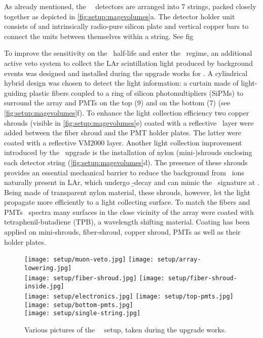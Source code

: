As already mentioned, the \gerda\ \phasetwo\ detectors are arranged into 7 strings, packed
closely together as depicted in \cref{fig:setup:magevolumes}a. The detector holder unit
consists of and intrinsically radio-pure silicon plate and vertical copper bars to connect
the units between themselves within a string. See fig \fillme

To improve the sensitivity on the \onbb\ half-life and enter the \bkgfree\ regime, an
additional active veto system to collect the LAr scintillation light produced by
background events was designed and installed during the upgrade works for \phasetwo. A
cylindrical hybrid design was chosen to detect the light information: a curtain made of
light-guiding plastic fibers coupled to a ring of silicon photomultipliers (SiPMs) to
surround the array and PMTs on the top (9) and on the bottom (7) (see
\cref{fig:setup:magevolumes}f). To enhance the light collection efficiency two copper
shrouds (visible in \cref{fig:setup:magevolumes}e) coated with a reflective \tetratex\
layer were added between the fiber shroud and the PMT holder plates. The latter were
coated with a reflective VM2000 layer. Another light collection improvement introduced by
the \phasetwo\ upgrade is the installation of nylon (mini-)shrouds enclosing each detector
string (\cref{fig:setup:magevolumes}d). The presence of these shrouds provides an
essential mechanical barrier to reduce the background from \kvz\ ions naturally present in
LAr, which undergo \b-decay and can mimic the \onbb\ signature at \qbb. Being made of
transparent nylon material, these shrouds, however, let the light propagate more
efficiently to a light collecting surface. To match the fibers and PMTs \fillme\ spectra
many surfaces in the close vicinity of the array were coated with tetraphenil-butadiene
(TPB), a wavelength shifting material. Coating has been applied on mini-shrouds,
fiber-shroud, copper shroud, PMTs as well as their holder plates.

\begin{figure}
  \texttt{[image: setup/muon-veto.jpg]}%
  \texttt{[image: setup/array-lowering.jpg]}\\
  \texttt{[image: setup/fiber-shroud.jpg]}%
  \texttt{[image: setup/fiber-shroud-inside.jpg]}\\
  \texttt{[image: setup/electronics.jpg]}%
  \texttt{[image: setup/top-pmts.jpg]}%
  \texttt{[image: setup/bottom-pmts.jpg]}\\
  \texttt{[image: setup/single-string.jpg]}
  \caption{%
    Various pictures of the \gerda\ \phasetwo\ setup, taken during the upgrade
    works.
  }\label{fig:setup:pictures}
\end{figure}

